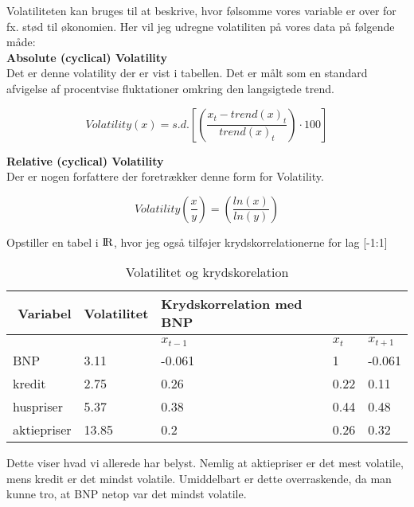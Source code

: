 \documentclass[
  10pt,
]{article}
\begin{document}
Volatiliteten kan bruges til at beskrive, hvor følsomme vores variable
er over for fx. stød til økonomien. Her vil jeg udregne volatiliten på
vores data på følgende måde:\\

\textbf{Absolute (cyclical) Volatility}\\
Det er denne volatility der er vist i tabellen. Det er målt som en
standard afvigelse af procentvise fluktationer omkring den langsigtede
trend.

\[Volatility(x) = s.d.[(\frac{x_t-trend(x)_t}{trend(x)_t})\cdot 100]\]

\textbf{Relative (cyclical) Volatility}\\
Der er nogen forfattere der foretrækker denne form for Volatility.

\[Volatility (\frac{x}{y}) = (\frac{ln(x)}{ln(y)})\]

Opstiller en tabel i \({\rm I\!R}\), hvor jeg også tilføjer
krydskorrelationerne for lag {[}-1:1{]}

\begin{table}[ht]
\centering
\caption{Volatilitet og krydskorelation}
\label{tab:tabel6}
\begin{tabular}{|l|l|l|l|l|}
\hline
\multicolumn{1}{|r|}{Variabel} & Volatilitet & Krydskorrelation med BNP &      &          \\ \hline
                               &             & $x_{t-1}$               & $x{_t}$ & $x_{t+1}$ \\ \hline
BNP                            & 3.11        & -0.061                   & 1    & -0.061   \\ \hline
kredit                         & 2.75        & 0.26                     & 0.22 & 0.11     \\ \hline
huspriser                      & 5.37        & 0.38                     & 0.44 & 0.48     \\ \hline
aktiepriser                    & 13.85       & 0.2                      & 0.26 & 0.32     \\ \hline
\end{tabular}
\end{table}

Dette viser hvad vi allerede har belyst. Nemlig at aktiepriser er det
mest volatile, mens kredit er det mindst volatile. Umiddelbart er dette
overraskende, da man kunne tro, at BNP netop var det mindst volatile.

\newpage
\end{document}

